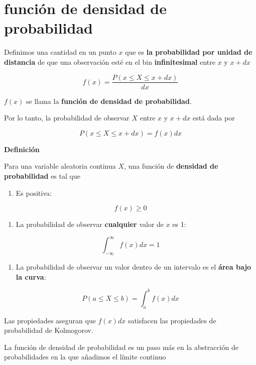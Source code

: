\documentclass[
]{book}
\providecommand{\tightlist}{%
  \setlength{\itemsep}{0pt}\setlength{\parskip}{0pt}}
\begin{document}
\hypertarget{funciuxf3n-de-densidad-de-probabilidad}{%
\section{función de densidad de probabilidad}\label{funciuxf3n-de-densidad-de-probabilidad}}

Definimos una cantidad en un punto \(x\) que es \textbf{la probabilidad por unidad de distancia} de que una observación esté en el bin \textbf{infinitesimal} entre \(x\) y \(x+dx\)

\[f(x)= \frac{ P(x\leq X \leq x+dx )}{dx}\]

\(f(x)\) se llama la \textbf{función de densidad de probabilidad}.

Por lo tanto, la probabilidad de observar \(X\) entre \(x\) y \(x+dx\)
está dada por

\[P( x\leq X \leq x+dx )= f(x) dx\]

\textbf{Definición}

Para una variable aleatoria continua \(X\), una función de \textbf{densidad de probabilidad} es tal que

\begin{enumerate}
\def\labelenumi{\arabic{enumi})}
\tightlist
\item
  Es positiva:
\end{enumerate}

\[f(x) \geq 0\]

\begin{enumerate}
\def\labelenumi{\arabic{enumi})}
\setcounter{enumi}{1}
\tightlist
\item
  La probabilidad de observar \textbf{cualquier} valor de \(x\) es 1:
\end{enumerate}

\[\int_{-\infty}^{\infty} f(x) dx = 1\]

\begin{enumerate}
\def\labelenumi{\arabic{enumi})}
\setcounter{enumi}{2}
\tightlist
\item
  La probabilidad de observar un valor dentro de un intervalo es el \textbf{área bajo la curva}:
\end{enumerate}

\[ P( a\leq X \leq b)=\int_{a}^{b} f(x) dx\]

Las propiedades aseguran que \(f(x)dx\) satisfacen las propiedades de probabilidad de Kolmogorov.

La función de densidad de probabilidad es un paso más en la abstracción de probabilidades en la que añadimos el límite continuo
\end{document}
